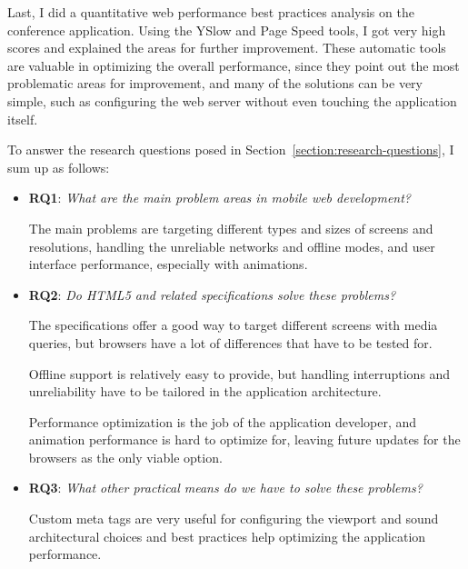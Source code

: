 Last, I did a quantitative web performance best practices analysis on
the conference application. Using the YSlow and Page Speed tools, I
got very high scores and explained the areas for further
improvement. These automatic tools are valuable in optimizing the
overall performance, since they point out the most problematic areas
for improvement, and many of the solutions can be very simple, such as
configuring the web server without even touching the application
itself.

To answer the research questions posed in
Section~\ref{section:research-questions}, I sum up as follows:

\begin{itemize}
\item \textbf{RQ1}: \textit{What are the main problem areas in mobile
  web development?}

  The main problems are targeting different types and sizes of screens
  and resolutions, handling the unreliable networks and offline modes,
  and user interface performance, especially with animations.

\item \textbf{RQ2}: \textit{Do HTML5 and related specifications solve
  these problems?}

  The specifications offer a good way to target different screens with
  media queries, but browsers have a lot of differences that have to
  be tested for.

  Offline support is relatively easy to provide, but handling
  interruptions and unreliability have to be tailored in the
  application architecture.

  Performance optimization is the job of the application developer,
  and animation performance is hard to optimize for, leaving future
  updates for the browsers as the only viable option.

\item \textbf{RQ3}: \textit{What other practical means do we have to
  solve these problems?}

  Custom meta tags are very useful for configuring the viewport and
  sound architectural choices and best practices help optimizing the
  application performance.

\end{itemize}
